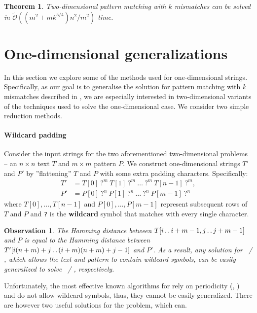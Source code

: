 \documentclass[11pt]{article}
\def\dd{\mathinner{.\,.}}
\newcommand{\tO}{\tilde{\mathcal{O}}}
\newcommand{\eq}[1]{\begin{align*} #1 \end{align*}}
\theoremstyle{plain}
\newtheorem{theorem}{Theorem}
\newtheorem{observation}{Observation}
\theoremstyle{definition}
\begin{document}
\begin{theorem}
	\label{main result}
	Two-dimensional pattern matching with $k$ mismatches can be solved in $\tO((m^2 + mk^{5/4})n^2 / m^2)$ time.
\end{theorem}


\section{One-dimensional generalizations}
In this section we explore some of the methods used for one-dimensional strings.
Specifically, as our goal is to generalise the solution for pattern matching with $k$ mismatches described in \cite{Gawrychowski2017}, we are especially interested in two-dimensional variants of the techniques used to solve the one-dimensional case.
We consider two simple reduction methods.

\paragraph{Wildcard padding}
Consider the input strings for the two aforementioned two-dimensional problems -- an $n \times n$ text $T$ and $m \times m$ pattern $P$.
We construct one-dimensional strings $T'$ and $P'$ by ''flattening'' $T$ and $P$ with some extra padding characters.
Specifically:
\eq{
	T' &= T[0] \ \texttt{?}^{m} \ T[1] \ \texttt{?}^{m} \ \dots \ \texttt{?}^{m} \ T[n - 1] \ \texttt{?}^{m}, \\
	P' &= P[0] \ \texttt{?}^{n} \ P[1] \ \texttt{?}^{n} \ \dots \ \texttt{?}^{n} \ P[m - 1] \ \texttt{?}^{n}
}                                                                          
where $T[0], \dots, T[n - 1]$ and $P[0], \dots, P[m - 1]$ represent subsequent rows of $T$ and $P$ and \texttt{?} is the \textbf{wildcard} symbol that matches with every single character.

\begin{observation}\label{wildcard reduction}
	The Hamming distance between $T[i \dd i + m - 1, j \dd j + m - 1]$ and $P$ is equal to the Hamming distance between $T'[i(n + m) + j \dd (i + m)(n + m) + j - 1]$ and $P'$.
	As a result, any solution for \hd \ / \pm, which allows the text and pattern to contain wildcard symbols, can be easily generalized to solve \HD \ / \PM, respectively.
\end{observation}

Unfortunately, the most effective known algorithms for \pm rely on periodicity (\cite{Clifford2015}, \cite{Gawrychowski2017}) and do not allow wildcard symbols, thus, they cannot be easily generalized.
There are however two useful solutions for the \hd problem, which can.
\end{document}
